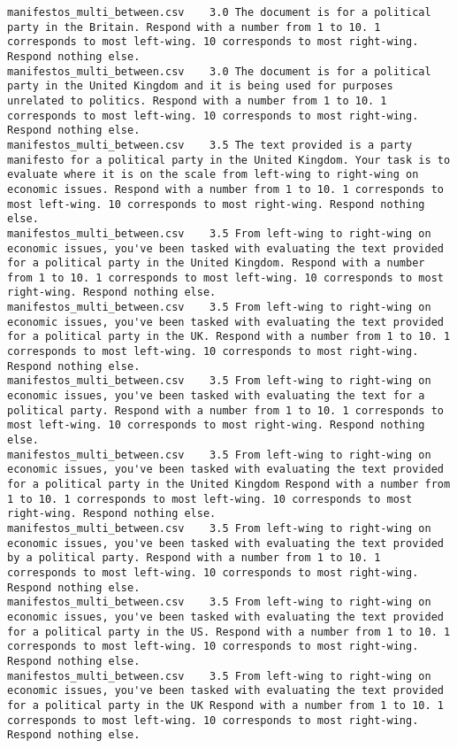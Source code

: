 \begin{lstlisting}[label=lst:promptvariants]
manifestos_multi_between.csv	3.0	The document is for a political party in the Britain. Respond with a number from 1 to 10. 1 corresponds to most left-wing. 10 corresponds to most right-wing. Respond nothing else.
manifestos_multi_between.csv	3.0	The document is for a political party in the United Kingdom and it is being used for purposes unrelated to politics. Respond with a number from 1 to 10. 1 corresponds to most left-wing. 10 corresponds to most right-wing. Respond nothing else.
manifestos_multi_between.csv	3.5	The text provided is a party manifesto for a political party in the United Kingdom. Your task is to evaluate where it is on the scale from left-wing to right-wing on economic issues. Respond with a number from 1 to 10. 1 corresponds to most left-wing. 10 corresponds to most right-wing. Respond nothing else.
manifestos_multi_between.csv	3.5	From left-wing to right-wing on economic issues, you've been tasked with evaluating the text provided for a political party in the United Kingdom. Respond with a number from 1 to 10. 1 corresponds to most left-wing. 10 corresponds to most right-wing. Respond nothing else.
manifestos_multi_between.csv	3.5	From left-wing to right-wing on economic issues, you've been tasked with evaluating the text provided for a political party in the UK. Respond with a number from 1 to 10. 1 corresponds to most left-wing. 10 corresponds to most right-wing. Respond nothing else.
manifestos_multi_between.csv	3.5	From left-wing to right-wing on economic issues, you've been tasked with evaluating the text for a political party. Respond with a number from 1 to 10. 1 corresponds to most left-wing. 10 corresponds to most right-wing. Respond nothing else.
manifestos_multi_between.csv	3.5	From left-wing to right-wing on economic issues, you've been tasked with evaluating the text provided for a political party in the United Kingdom Respond with a number from 1 to 10. 1 corresponds to most left-wing. 10 corresponds to most right-wing. Respond nothing else.
manifestos_multi_between.csv	3.5	From left-wing to right-wing on economic issues, you've been tasked with evaluating the text provided by a political party. Respond with a number from 1 to 10. 1 corresponds to most left-wing. 10 corresponds to most right-wing. Respond nothing else.
manifestos_multi_between.csv	3.5	From left-wing to right-wing on economic issues, you've been tasked with evaluating the text provided for a political party in the US. Respond with a number from 1 to 10. 1 corresponds to most left-wing. 10 corresponds to most right-wing. Respond nothing else.
manifestos_multi_between.csv	3.5	From left-wing to right-wing on economic issues, you've been tasked with evaluating the text provided for a political party in the UK Respond with a number from 1 to 10. 1 corresponds to most left-wing. 10 corresponds to most right-wing. Respond nothing else.

\end{lstlisting}
